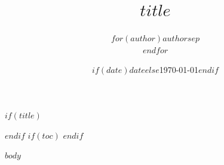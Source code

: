 \documentclass[12pt,a4paper]{article}
\title{$title$}
\author{$for(author)$$author$$sep$ \\ $endfor$}
\date{$if(date)$$date$$else$\today$endif$}
\begin{document}
$if(title)$
\maketitle
$endif$
$if(toc)$
\tableofcontents
\newpage
$endif$

$body$
\end{document}
